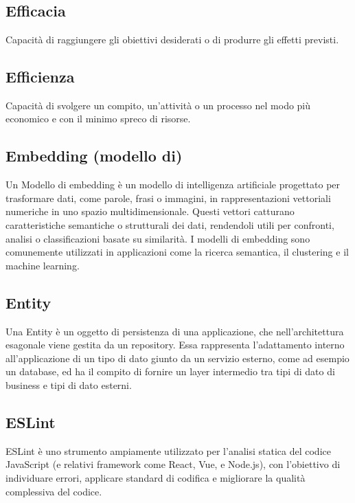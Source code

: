 \section{}

\hypertarget{sec:efficacia}{}
\subsection*{Efficacia}
Capacità di raggiungere gli obiettivi desiderati o di produrre gli effetti previsti.

\hypertarget{sec:efficienza}{}
\subsection*{Efficienza}
Capacità di svolgere un compito, un'attività o un processo nel modo più economico e con il minimo spreco di risorse.

\hypertarget{sec:embedding}{}
\subsection*{Embedding (modello di)}
Un Modello di embedding è un modello di intelligenza artificiale progettato per trasformare dati, come parole, frasi o immagini, in rappresentazioni 
vettoriali numeriche in uno spazio multidimensionale. Questi vettori catturano caratteristiche semantiche o strutturali dei dati, rendendoli utili per 
confronti, analisi o classificazioni basate su similarità. I modelli di embedding sono comunemente utilizzati in applicazioni come la ricerca semantica, 
il clustering e il machine learning.

\hypertarget{sec:entity}{}
\subsection*{Entity}
Una Entity è un oggetto di persistenza di una applicazione, che nell'architettura esagonale viene gestita da un repository.
Essa rappresenta l'adattamento interno all'applicazione di un tipo di dato giunto da un servizio esterno, come ad esempio un database,
ed ha il compito di fornire un layer intermedio tra tipi di dato di business e tipi di dato esterni.

\hypertarget{sec:eslint}{}
\subsection*{ESLint}
ESLint è uno strumento ampiamente utilizzato per l'analisi statica del codice JavaScript (e relativi framework come React, Vue, e Node.js), 
con l'obiettivo di individuare errori, applicare standard di codifica e migliorare la qualità complessiva del codice.
\newpage


